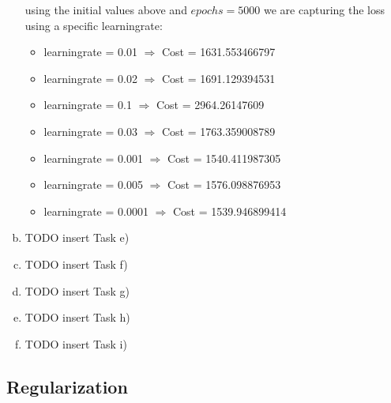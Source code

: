 \documentclass[12pt]{article}
\begin{document}
\begin{enumerate}[a)]
        using the initial values above and $epochs = 5000$ we are capturing the loss using a specific learningrate:
        \begin{itemize}
            \item
                learningrate = 0.01 $\Rightarrow$ Cost = 1631.553466797
            \item 
                learningrate = 0.02 $\Rightarrow$ Cost = 1691.129394531
            \item
                learningrate = 0.1 $\Rightarrow$ Cost = 2964.26147609
            \item
                learningrate = 0.03 $\Rightarrow$ Cost = 1763.359008789
            \item
                learningrate = 0.001 $\Rightarrow$ Cost = 1540.411987305
            \item
                learningrate = 0.005 $\Rightarrow$ Cost = 1576.098876953
            \item
                learningrate = 0.0001 $\Rightarrow$ Cost = 1539.946899414
        \end{itemize}

    \item 
        TODO insert Task e)

    \item 
        TODO insert Task f)

    \item 
        TODO insert Task g)

    \item 
        TODO insert Task h)

    \item 
        TODO insert Task i)

\end{enumerate}

\subsection{Regularization}
\end{document}
